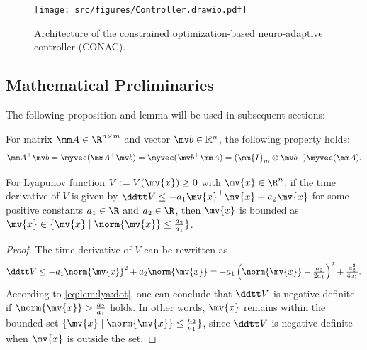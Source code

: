\documentclass[journal]{IEEEtran}
\begin{document}
\begin{figure}[!t]
    \centering
    \texttt{[image: src/figures/Controller.drawio.pdf]}
    \caption{Architecture of the constrained optimization-based neuro-adaptive controller (CONAC).}
    \label{fig:ctrl:diagram}
\end{figure}

\subsection{Mathematical Preliminaries}\label{sec:sub:math preliminaries}

The following proposition and lemma will be used in subsequent sections:

\begin{propsit} \label{propsit:kron}
	For matrix $\mm A\in\R^{n\times m}$ and vector $\mv b\in\mathbb R^n$, the following property holds:
	\begin{equation}
		\mm A^\top \mv b 
		= 
		\myvec(\mm A^\top\mv b)
		=
		\myvec(\mv b^\top\mm A)
		= 
		(\mm{I}_{m}\otimes \mv b^\top) \myvec(\mm A)
		.
	\end{equation}
\end{propsit}


\begin{lem} \label{lem:stable:set}
    For Lyapunov function $V:=V(\mv{x})\ge0$ with $\mv{x}\in\R^n$, if the time derivative of $V$ is given by $\ddtt V\le -a_1 \mv{x}^\top \mv{x} + a_2 \mv{x}$ for some positive constants $a_1\in\R$ and $a_2\in\R$, then $\mv{x}$ is bounded as $\mv{x}\in\{\mv{x}\mid\norm{\mv{x}}\le\tfrac{a_2}{a_1}\}$.
\end{lem}

\begin{proof}
    The time derivative of $V$ can be rewritten as
    \begin{equation}
        \ddtt V
        \le
        -a_1 \norm{\mv{x}}^2 + a_2 \norm{\mv{x}}
        =
        -a_1
        \left(
            \norm{\mv{x}}-\tfrac{a_2}{2a_1}
        \right)^2
        +
        \tfrac{a_2^2}{4a_1}
        .
        \label{eq:lem:lya:dot}
    \end{equation}
    According to \eqref{eq:lem:lya:dot}, one can conclude that $\ddtt V$ is negative definite if $\norm{\mv{x}}>\tfrac{a_2}{a_1}$ holds.
    In other words, $\mv{x}$ remains within the bounded set $\{\mv{x}\mid\norm{\mv{x}}\le\tfrac{a_2}{a_1}\}$, since $\ddtt V$ is negative definite when $\mv{x}$ is outside the set.
\end{proof}
\end{document}

